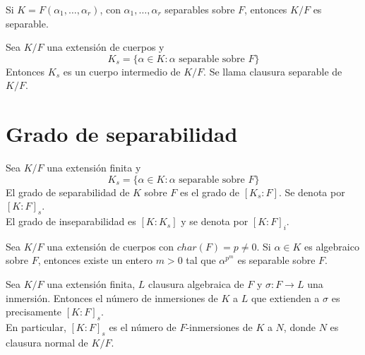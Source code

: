 \begin{corollary}
    Si $K = F(\alpha_1, \dots, \alpha_r)$, con $\alpha_1, \dots, \alpha_r$ separables sobre $F$, entonces $K/F$ es separable.
\end{corollary}

\begin{corollary}
    Sea $K/F$ una extensión de cuerpos y
    $$K_s = \{ \alpha \in K : \alpha \text{ separable sobre } F \}$$
    Entonces $K_s$ es un cuerpo intermedio de $K/F$. Se llama clausura separable de $K/F$.
\end{corollary}

\section{Grado de separabilidad}

\begin{definition}
    Sea $K/F$ una extensión finita y
    $$K_s = \{ \alpha \in K : \alpha \text{ separable sobre } F \}$$
    El grado de separabilidad de $K$ sobre $F$ es el grado de $[K_s : F]$. Se denota por $[K : F]_s$.\\
    El grado de inseparabilidad es $[K : K_s]$ y se denota por $[K : F]_i$.
\end{definition}

\begin{lemma}
    Sea $K/F$ una extensión de cuerpos con $char(F) = p \neq 0$.
    Si $\alpha \in K$ es algebraico sobre $F$, entonces existe un entero $m > 0$ tal que $\alpha^{p^m}$ es separable sobre $F$.
\end{lemma}

\begin{proposition}
    Sea $K/F$ una extensión finita, $L$ clausura algebraica de $F$ y $\sigma : F \to L$ una inmersión.
    Entonces el número de inmersiones de $K$ a $L$ que extienden a $\sigma$ es precisamente $[K : F]_s$.\\
    En particular, $[K : F]_s$ es el número de $F$-inmersiones de $K$ a $N$, donde $N$ es clausura normal de $K/F$.
\end{proposition}